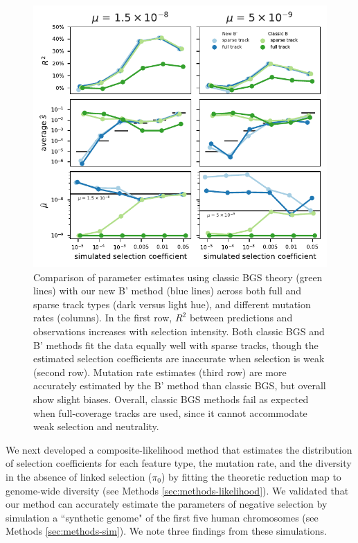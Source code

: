 \documentclass[11pt]{article}
\begin{document}
\begin{figure}[htbp] \centering
    \includegraphics[width=\textwidth]{figures/figure_2.pdf} 
    \caption{Comparison of parameter estimates using classic BGS theory (green
        lines) with our new B' method (blue lines) across both full and sparse
        track types (dark versus light hue), and different mutation rates
        (columns). In the first row, $R^2$ between predictions and observations
        increases with selection intensity. Both classic BGS and B' methods fit
        the data equally well with sparse tracks, though the estimated
        selection coefficients are inaccurate when selection is weak (second
        row). Mutation rate estimates (third row) are more accurately estimated
        by the B' method than classic BGS, but overall show slight biases.
        Overall, classic BGS methods fail as expected when full-coverage tracks
    are used, since it cannot accommodate weak selection and neutrality. }
  \label{fig:figure-2}
\end{figure}

We next developed a composite-likelihood method that estimates the distribution
of selection coefficients for each feature type, the mutation rate, and the
diversity in the absence of linked selection ($\pi_0$) by fitting the theoretic
reduction map to genome-wide diversity (see Methods
\ref{sec:methods-likelihood}). We validated that our method can accurately
estimate the parameters of negative selection by simulation a ``synthetic
genome" of the first five human chromosomes (see Methods
\ref{sec:methods-sim}). We note three findings from these simulations.
\end{document}
